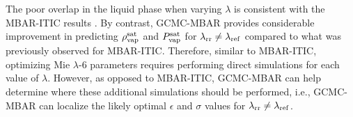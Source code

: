 \documentclass[journal=jced,manuscript=article]{achemso}
\begin{document}

The poor overlap in the liquid phase when varying $\lambda$ is consistent with the MBAR-ITIC results \cite{Postdoc_1}. By contrast, GCMC-MBAR provides considerable improvement in predicting $\rho_{\rm vap}^{\rm sat}$ and $P_{\rm vap}^{\rm sat}$ for $\lambda_{\rm rr} \neq \lambda_{\rm ref}$ compared to what was previously observed for MBAR-ITIC. Therefore, similar to MBAR-ITIC, optimizing Mie $\lambda$-6 parameters requires performing direct simulations for each value of $\lambda$. However, as opposed to MBAR-ITIC, GCMC-MBAR can help determine where these additional simulations should be performed, i.e., GCMC-MBAR can localize the likely optimal $\epsilon$ and $\sigma$ values for $\lambda_{\rm rr} \neq \lambda_{\rm ref}$.

\end{document}
